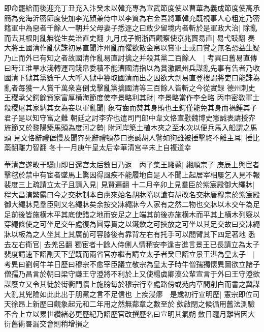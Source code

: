 即命罷給而後迎充丁丑充入汴癸未以韓充專為宣武節度使以曹華為義成節度使高承簡為兖海沂密節度使加李光顔兼侍中以李質為右金吾將軍韓充既視事人心粗定乃密籍軍中為惡者千餘人一朝并父母妻子悉逐之曰敢少留境内者斬於是軍政大治|{
	除亂而去其根則亂無從生矣治直史翻}
九月戊子朔浙西觀察使京兆竇易直|{
	易弋豉翻}
奏大將王國清作亂伏誅初易直聞汴州亂而懼欲散金帛以賞軍士或曰賞之無名恐益生疑乃止而外已有知之者故國清作亂易直討擒之并殺其黨二百餘人　|{
	考異曰舊易直傳曰時江淮旱水淺轉運司錢帛委積不能漕國清指以為賞激諷州兵謀亂先事有告者乃收國清下獄其黨數千人大呼入獄中篡取國清而出之因欲大剽易直登樓謂將吏曰能誅為亂者每獲一人賞千萬衆喜倒戈擊亂黨擒國清等三百餘人皆斬之今從實録}
德州刺史王稷承父鍔餘貲家富厚横海節度使李景略利其財|{
	李景略當作李全略}
丙申密敎軍士殺稷屠其家納其女為妾以軍亂聞|{
	象有齒而焚其身賄也王鍔僅能免其身而禍鍾其子君子是以知守富之難}
朝廷之討李㝏也遣司門郎中韋文恪宣慰魏博史憲誠表請授㝏旌節又於黎陽築馬頭為度河之勢|{
	附河岸築土植木夾之至水次以便兵馬入船謂之馬頭}
見文恪辭禮倨慢及聞㝏死辭禮頓恭曰憲誠胡人譬如狗雖被捶擊終不離主耳|{
	捶比蘂翻離力智翻}
冬十一月庚午皇太后幸華清宫辛未上自複道幸

華清宫遂畋于驪山即日還宫太后數日乃返　丙子集王緗薨|{
	緗順宗子}
庚辰上與宦者擊毬於禁中有宦者墜馬上驚因得風疾不能履地自是人不聞上起居宰相屢乞入見不報裴度三上疏請立太子且請入見|{
	見賢遍翻}
十二月辛卯上見羣臣於紫宸殿御大繩牀|{
	程大昌演繁露曰今之交牀制本自虜來始名胡牀隋以䜟有胡改名交牀唐穆宗於紫宸殿御大繩牀見羣臣則又名繩牀矣余按交牀繩牀今人家有之然二物也交牀以木交午為足足前後皆施横木平其底使錯之地而安足之上端其前後亦施横木而平其上横木列竅以穿繩條使之可坐足交午處復為圓穿貫之以鐵歛之可挾放之可坐以其足交故曰交牀繩牀以板為之人坐其上其廣前可容膝後有靠背左右有托手可以閤臂其下四足著地}
悉去左右衛官|{
	去羌呂翻}
獨宦者十餘人侍側人情稍安李逢吉進言景王已長請立為太子裴度請速下詔副天下望既而兩省官亦繼有請立太子者癸巳詔立景王湛為皇太子　|{
	考異曰劉軻牛羊日歷曰穆宗不愈宰臣議立敬宗為皇太子時牛僧孺獨懷異圖欲立諸子僧孺乃昌言於朝曰梁守謙王守澄將不利於上又使楊虡卿漢公輩宣言于外曰王守澄欲謀廢立又令其徒於街衢門牆上施牓每於穆宗行幸處路傍或苑内草間削白而書之冀謀大亂其兇險如此此出于朋黨之言不足信也}
上疾浸瘳　是歲初行宣明歷|{
	憲宗即位司天徐昂上新歷曰觀象起元和二年用之然無蔀章之數至於歛啟閉之候循用舊法測驗不合上立以累世纘緒必更歷紀乃詔歷官改撰歷名曰宣明其氣朔斂日躔月離皆因大衍舊術晷漏交會則稍增損之}


